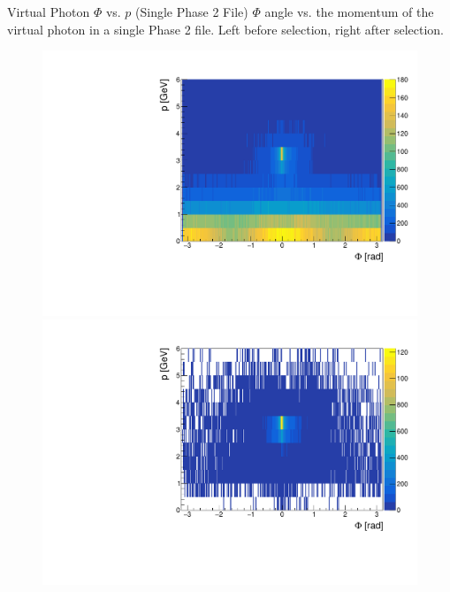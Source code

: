 \documentclass[10pt]{beamer}
\begin{document}
\begin{frame}{Virtual Photon $\Phi$ vs. $p$ (Single Phase 2 File)}
	$\Phi$ angle vs. the momentum of the virtual photon in a single Phase 2 file. Left before selection, right after selection.
	
	\begin{figure}
		\centering
		\begin{minipage}{.5\textwidth}
			\centering
			\includegraphics[width=\textwidth]{gg/data/PhiMgg_BS}
			
		\end{minipage}%
		\begin{minipage}{.5\textwidth}
			\centering
			\includegraphics[width=\textwidth]{gg/data/PhiMgg_AS}
			
		\end{minipage}
	\end{figure}
\end{frame}
\end{document}
